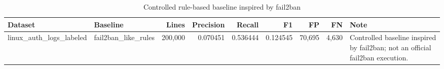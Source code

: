 \begin{table}[t]
\caption{Controlled rule-based baseline inspired by fail2ban}
\label{tab:fail2ban_like}
\centering
\scriptsize
\begin{tabularx}{\linewidth}{p{2.2cm}p{2.0cm}r r r r r r X}
\toprule
\textbf{Dataset} & \textbf{Baseline} & \textbf{Lines} & \textbf{Precision} & \textbf{Recall} & \textbf{F1} & \textbf{FP} & \textbf{FN} & \textbf{Note} \\
\midrule
linux\_auth\_logs\_labeled & fail2ban\_like\_rules & 200,000 & 0.070451 & 0.536444 & 0.124545 & 70,695 & 4,630 & Controlled baseline inspired by fail2ban; not an official fail2ban execution. \\
\bottomrule
\end{tabularx}
\end{table}
